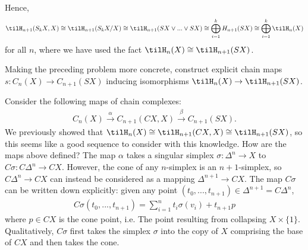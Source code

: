 \begin{homework}[e]
\begin{prf}
\begin{center}
      \label{fig:prob1-2}
    \end{center}
    Hence,
    \begin{align*}
      \tilH_{n+1}(S_kX,X) \cong \tilH_{n+1}(S_kX/X) \cong \tilH_{n+1}(SX\vee...\vee SX) \cong \bigoplus_{i=1}^k H_{n+1}(SX) \cong \bigoplus^k_{i=1} \tilH_n(X)
    \end{align*}
    for all $n$, where we have used the fact $\tilH_n(X) \cong \tilH_{n+1}(SX)$.
  \end{prf}
   Making the preceding problem more concrete, construct explicit chain maps $s:C_n(X) \to C_{n+1}(SX)$ inducing isomorphisms $\tilH_n(X) \to \tilH_{n+1}(SX)$.
  \begin{prf}
    Consider the following maps of chain complexes:
    \begin{align*}
      C_n(X) \xrightarrow{\alpha} C_{n+1}(CX,X) \xrightarrow{\beta} C_{n+1}(SX).
    \end{align*}
    We previously showed that $\tilH_n(X) \cong \tilH_{n+1}(CX,X)\cong \tilH_{n+1}(SX)$, so this seems like a good sequence to consider with this knowledge. How are the maps above defined? The map $\alpha$ takes a singular simplex $\sigma:\Delta^n\to X$ to $C\sigma:C\Delta^n\to CX$. However, the cone of any $n$-simplex is an $n+1$-simplex, so $C\Delta^n\to CX$ can instead be considered as a mapping $\Delta^{n+1}\to CX$. The map $C\sigma$ can be written down explicitly: given any point $(t_0,...,t_{n+1})\in \Delta^{n+1} = C\Delta^{n}$,
    \begin{align*}
      C\sigma(t_0,...,t_{n+1}) = \sum_{i=1}^n t_i\sigma(v_i) + t_{n+1}p
    \end{align*}
    where $p \in CX$ is the cone point, i.e. The point resulting from collapsing $X\times \{1\}$. Qualitatively, $C\sigma$ first takes the simplex $\sigma$ into the copy of $X$ comprising the base of $CX$ and then takes the cone.


\end{prf}
\end{homework}
